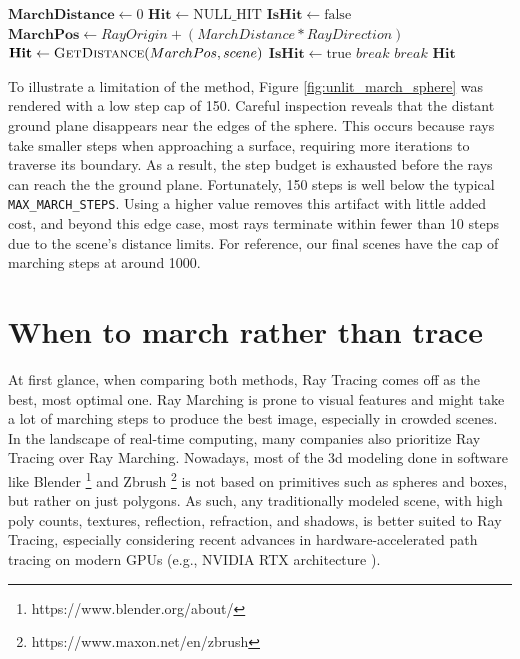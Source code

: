 \begin{algorithm}[ht]
\caption{MarchRay}
\label{alg:marchray}
\begin{algorithmic}[1]
    \State $ \mathbf{MarchDistance} \gets \text{0} $
    \State $ \mathbf{Hit} \gets \text{NULL\_HIT} $
    \State $ \mathbf{IsHit} \gets \text{false} $
        \State $\mathbf{MarchPos} \gets  RayOrigin+ (MarchDistance * RayDirection) $
        \State $\mathbf{Hit} \gets \Call{GetDistance}{MarchPos, scene}$
            \State $ \mathbf{IsHit} \gets \text{true} $
            \State $ break $
        \EndIf
            \State $ break $
        \EndIf
    \EndFor
    \State \Return $\mathbf{Hit}$
\EndProcedure
\end{algorithmic}
\end{algorithm}

To illustrate a limitation of the method, Figure \ref{fig:unlit_march_sphere} was rendered with a low step cap of 150. Careful inspection reveals that the distant ground plane disappears near the edges of the sphere. This occurs because rays take smaller steps when approaching a surface, requiring more iterations to traverse its boundary. As a result, the step budget is exhausted before the rays can reach the the ground plane. Fortunately, 150 steps is well below the typical \texttt{MAX\_MARCH\_STEPS}. Using a higher value removes this artifact with little added cost, and beyond this edge case, most rays terminate within fewer than 10 steps due to the scene's distance limits. For reference, our final scenes have the cap of marching steps at around 1000.

\section{When to march rather than trace}

At first glance, when comparing both methods, Ray Tracing comes off as the best, most optimal one. Ray Marching is prone to visual features and might take a lot of marching steps to produce the best image, especially in crowded scenes. In the landscape of real-time computing, many companies also prioritize Ray Tracing over Ray Marching. Nowadays, most of the 3d modeling done in software like Blender \footnote{https://www.blender.org/about/} and Zbrush \footnote{https://www.maxon.net/en/zbrush} is not based on primitives such as spheres and boxes, but rather on just polygons. As such, any traditionally modeled scene, with high poly counts, textures, reflection, refraction, and shadows, is better suited to Ray Tracing, especially considering recent advances in hardware-accelerated path tracing on modern GPUs 
(e.g., NVIDIA RTX architecture \cite{:NVIDIA}).

